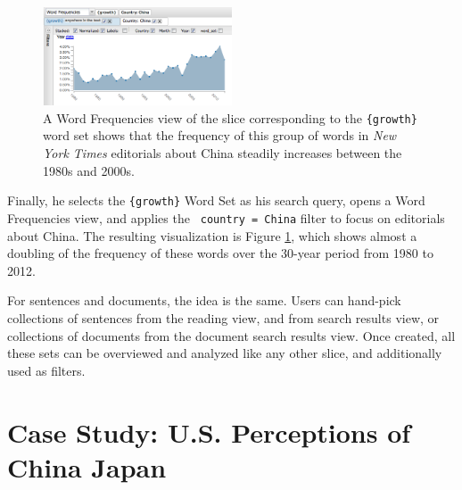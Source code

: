 \documentclass{sig-alternate}
\newcommand{\code}[1] {\texttt{#1}}
\begin{document}
\begin{figure}[ht!]
\begin{center}
	\includegraphics[width=0.5\textwidth]{fig/chris/04a.png}
\end{center}
    \caption{%
	A Word Frequencies view of the slice corresponding to the \code{\{growth\}} word set shows that the frequency of this group of words in \emph{New York Times} editorials about China steadily increases between the 1980s and 2000s. \label{fig:chris04a}
     }%
\end{figure}

Finally, he selects the  \code{\{growth\}} Word Set as his search query, opens a Word Frequencies view, and applies the \code{ country = China} filter to focus on editorials about China. The resulting visualization is Figure \ref{fig:chris04a}, which shows almost a doubling of the frequency of these words over the 30-year period from 1980 to 2012.

For sentences and documents, the idea is the same.  Users can hand-pick collections of sentences from the reading view, and from search results view, or collections of documents from the document search results view.  Once created, all these sets can be overviewed and analyzed like any other slice, and additionally used as filters.

\section{Case Study: U.S. Perceptions of\\China Japan}
\end{document}
